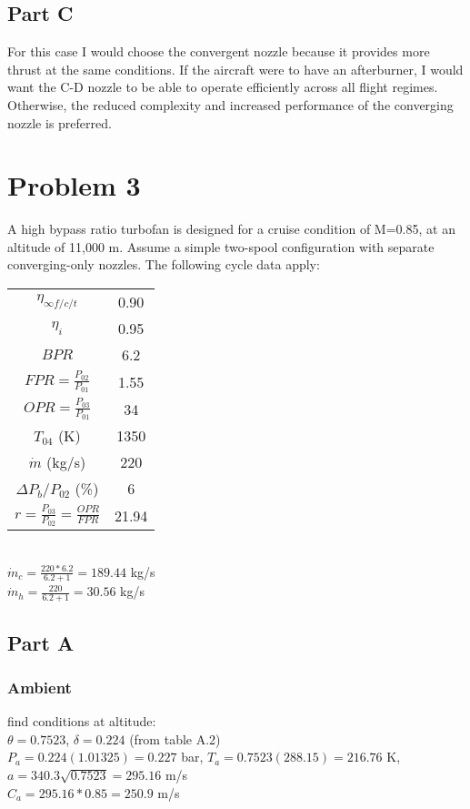 \documentclass{article}
\begin{document}
\subsection*{Part C}
For this case I would choose the convergent nozzle because it provides more thrust
at the same conditions. If the aircraft were to have an afterburner, I would want the C-D
nozzle to be able to operate efficiently across all flight regimes. Otherwise, the reduced
complexity and increased performance of the converging nozzle is preferred.

\section*{Problem 3}
A high bypass ratio turbofan is designed for a cruise condition of M=0.85, at
an altitude of 11,000 m. Assume a simple two-spool configuration with separate
converging-only nozzles. The following cycle data apply:
\begin{center}
\begin{tabular}{cc}
    $\eta_{\infty f/c/t}$ & 0.90 \\
    $\eta_i$ & 0.95 \\
    $BPR$ & 6.2 \\
    $FPR=\frac{P_{02}}{P_{01}}$ & 1.55 \\
    $OPR=\frac{P_{03}}{P_{01}}$ & 34 \\
    $T_{04}$ (K) & 1350 \\
    $\dot{m}$ (kg/s) & 220 \\
    $\Delta P_b/P_{02}$ (\%) & 6 \\
    $r=\frac{P_{03}}{P_{02}}=\frac{OPR}{FPR}$ & 21.94
\end{tabular} \\
$\dot{m}_c=\frac{220*6.2}{6.2 + 1}=189.44$ kg/s \\
$\dot{m}_h=\frac{220}{6.2 + 1}=30.56$ kg/s
\end{center}

\subsection*{Part A}
\subsubsection*{Ambient}
find conditions at altitude: \\
$\theta=0.7523$, $\delta=0.224$ (from table A.2) \\
$P_a=0.224(1.01325)=0.227$ bar, $T_a=0.7523(288.15)=216.76$ K,
$a=340.3\sqrt{0.7523}=295.16$ m/s \\
$C_a=295.16*0.85=250.9$ m/s
\end{document}
